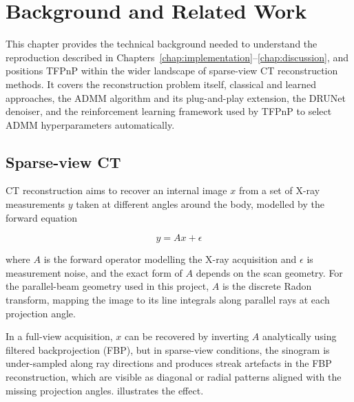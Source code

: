 \chapter{Background and Related Work}
\label{chap:background}

This chapter provides the technical background needed to understand the reproduction described in Chapters~\ref{chap:implementation}--\ref{chap:discussion}, and positions TFPnP within the wider landscape of sparse-view CT reconstruction methods. It covers the reconstruction problem itself, classical and learned approaches, the ADMM algorithm and its plug-and-play extension, the DRUNet denoiser, and the reinforcement learning framework used by TFPnP to select ADMM hyperparameters automatically.

\section{Sparse-view CT}
\label{sec:sparse-view-ct}

CT reconstruction aims to recover an internal image $x$ from a set of X-ray measurements $y$ taken at different angles around the body, modelled by the forward equation

\begin{equation}
    y = A x + \epsilon
    \label{eq:ct_forward}
\end{equation}

where $A$ is the forward operator modelling the X-ray acquisition and $\epsilon$ is measurement noise, and the exact form of $A$ depends on the scan geometry. For the parallel-beam geometry used in this project, $A$ is the discrete Radon transform, mapping the image to its line integrals along parallel rays at each projection angle.

In a full-view acquisition, $x$ can be recovered by inverting $A$ analytically using filtered backprojection (FBP), but in sparse-view conditions, the sinogram is under-sampled along ray directions and produces streak artefacts in the FBP reconstruction, which are visible as diagonal or radial patterns aligned with the missing projection angles.  illustrates the effect. 

